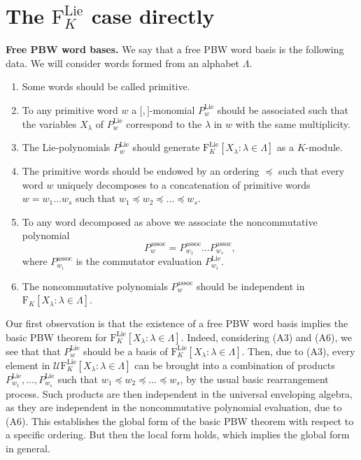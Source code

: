 \documentclass[11pt,a4paper]{amsart}
\newcommand{\plabel}[1]{ \label{#1}}
\newcommand{\plabel}[1]{ \label{#1}\rlap{\smash{${}^{^{[#1]}}$}}}
\newcommand{\plabel}[1]{ \label{#1}}
\DeclareMathOperator{\Lie}{Lie}
\newcommand{\bo}{\boldsymbol}
\newcommand{\ass}{\mathrm{assoc}}
\theoremstyle{definition}
\theoremstyle{plain}
\begin{document}
\section{The $\mathrm F_{K}^{\Lie}$ case directly}\plabel{sec:freedirect}
\textbf{Free PBW word bases.}
We say that a free PBW word basis is the following data.
We will consider  words formed from an alphabet $\Lambda$.
\begin{enumerate}
\item[(A1)] Some words  should be called primitive.
\item[(A2)] To any primitive word $w$ a $\bo[,\bo]$-monomial $P^{\Lie}_w$ should be associated such that the variables
 $X_\lambda$ of $P^{\Lie}_w$ correspond to the $\lambda$ in $w$ with the same multiplicity.
\item[(A3)] The Lie-polynomials $P^{\Lie}_w$ should generate $\mathrm F_{K}^{\Lie}[X_\lambda:\lambda\in\Lambda]$ as a $K$-module.
\item[(A4)] The primitive words should be endowed by an ordering $\preccurlyeq$ such that
 every word $w$ uniquely decomposes to a concatenation of primitive words $w=w_1\ldots w_s$ such that
 $w_1  \preccurlyeq w_2 \preccurlyeq\ldots\preccurlyeq w_s$.
\item[(A5)] To any word decomposed as above we associate the noncommutative polynomial
\[P^\ass_w=P^\ass_{w_1}\ldots P^\ass_{w_s},\]
 where $P^\ass_{w_i}$ is the commutator evaluation $P^{\Lie}_{w_i}$.
\item[(A6)] The noncommutative polynomials $P^\ass_w$ should be independent in $\mathrm F_{K}[X_\lambda:\lambda\in\Lambda]$.
\end{enumerate}

Our first observation is that the existence of a free PBW word basis implies the basic PBW theorem for
 $\mathrm F_{K}^{\Lie}[X_\lambda:\lambda\in\Lambda]$.
Indeed, considering (A3) and (A6), we see that that  $P_w^{\Lie}$ should be a basis of $\mathrm F_{K}^{\Lie}[X_\lambda:\lambda\in\Lambda]$.
Then, due to (A3), every element in $\mathcal U \mathrm F_{K}^{\Lie}[X_\lambda:\lambda\in\Lambda]$
 can be brought into a combination of products
 $P_{w_1}^{\Lie},\ldots,P_{w_s}^{\Lie}$ such that $w_1\preccurlyeq w_2\preccurlyeq\ldots\preccurlyeq w_s$,
 by the usual basic rearrangement process.
Such products are then independent in the universal enveloping algebra,
 as they are independent in the noncommutative polynomial evaluation, due to (A6).
This establishes the global form of the  basic PBW theorem with respect to a specific ordering.
But then the local form holds, which implies the global form in general.
\end{document}
